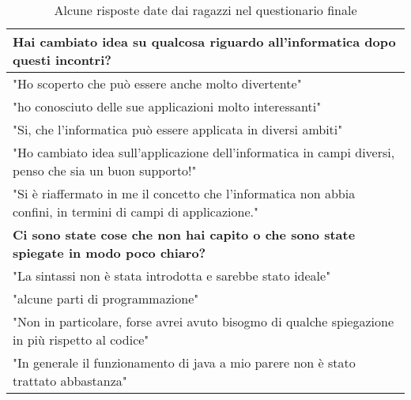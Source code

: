 \begin{center}
\def\arraystretch{1.5}
\begin{table}[!ht]

    \caption{Alcune risposte date dai ragazzi nel questionario finale}

    \begin{tabular}{p{}}
        
        \bfseries{Hai cambiato idea su qualcosa riguardo all'informatica dopo questi incontri?} \\
        \midrule
        "Ho scoperto che può essere anche molto divertente"  \\
        "ho conosciuto delle sue applicazioni molto interessanti" \\
        "Si, che l'informatica può essere applicata in diversi ambiti" \\
        "Ho cambiato idea sull'applicazione dell'informatica in campi diversi, penso che sia un buon supporto!" \\
        "Si è riaffermato in me il concetto che l'informatica non abbia confini, in termini di campi di applicazione." \\
        \midrule
        \bfseries{Ci sono state cose che non hai capito o che sono state spiegate in modo poco chiaro?} \\
        \midrule
        "La sintassi non è stata introdotta e sarebbe stato ideale" \\
        "alcune parti di programmazione" \\
        "Non in particolare, forse avrei avuto bisogmo di qualche spiegazione in più rispetto al codice" \\
        "In generale il funzionamento di java a mio parere non è stato trattato abbastanza" \\
    \end{tabular}
    \label{table:risposte_finali}
\end{table}


\end{center}